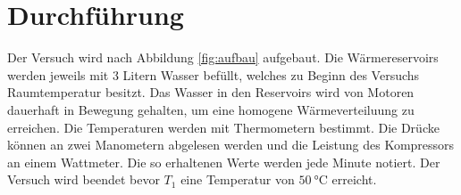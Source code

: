 \section{Durchführung}
\label{sec:Durchführung}
Der Versuch wird nach Abbildung \ref{fig:aufbau} aufgebaut.
Die Wärmereservoirs werden jeweils mit 3 Litern Wasser befüllt, welches zu Beginn des Versuchs Raumtemperatur besitzt.
Das Wasser in den Reservoirs wird von Motoren dauerhaft in Bewegung gehalten, um eine homogene Wärmeverteiluung zu erreichen.
Die Temperaturen werden mit Thermometern bestimmt.
Die Drücke können an zwei Manometern abgelesen werden und die Leistung des Kompressors an einem Wattmeter.
Die so erhaltenen Werte werden jede Minute notiert.
Der Versuch wird beendet bevor $T_1$ eine Temperatur von $\SI{50}{\celsius}$ erreicht.
